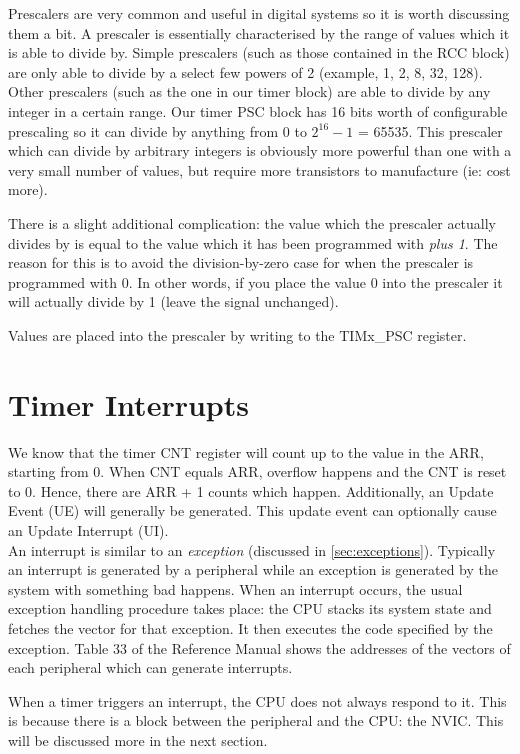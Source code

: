 Prescalers are very common and useful in digital systems so it is worth discussing them a bit. A prescaler is essentially characterised by the range of values which it is able to divide by. Simple prescalers (such as those contained in the RCC block) are only able to divide by a select few powers of 2 (example, 1, 2, 8, 32, 128). Other prescalers (such as the one in our timer block) are able to divide by any integer in a certain range. Our timer PSC block has 16 bits worth of configurable prescaling so it can divide by anything from 0 to $2^{16} - 1$ = 65535. This prescaler which can divide by arbitrary integers is obviously more powerful than one with a very small number of values, but require more transistors to manufacture (ie: cost more). 

There is a slight additional complication: the value which the prescaler actually divides by is equal to the value which it has been programmed with \emph{plus 1}. The reason for this is to avoid the division-by-zero case for when the prescaler is programmed with 0. In other words, if you place the value 0 into the prescaler it will actually divide by 1 (leave the signal unchanged). 

Values are placed into the prescaler by writing to the TIMx\_PSC register.

\section{Timer Interrupts}
We know that the timer CNT register will count up to the value in the ARR, starting from 0.
When CNT equals ARR, overflow happens and the CNT is reset to 0. 
Hence, there are ARR + 1 counts which happen.
Additionally, an Update Event (UE) will generally be generated. 
This update event can optionally cause an Update Interrupt (UI).\\

An interrupt is similar to an \emph{exception} (discussed in \autoref{sec:exceptions}). Typically an interrupt is generated by a peripheral while an exception is generated by the system with something bad happens. When an interrupt occurs, the usual exception handling procedure takes place: the CPU stacks its system state and fetches the vector for that exception. It then executes the code specified by the exception. Table 33 of the Reference Manual shows the addresses of the vectors of each peripheral which can generate interrupts. 

When a timer triggers an interrupt, the CPU does not always respond to it. This is because there is a block between the peripheral and the CPU: the NVIC. This will be discussed more in the next section.

